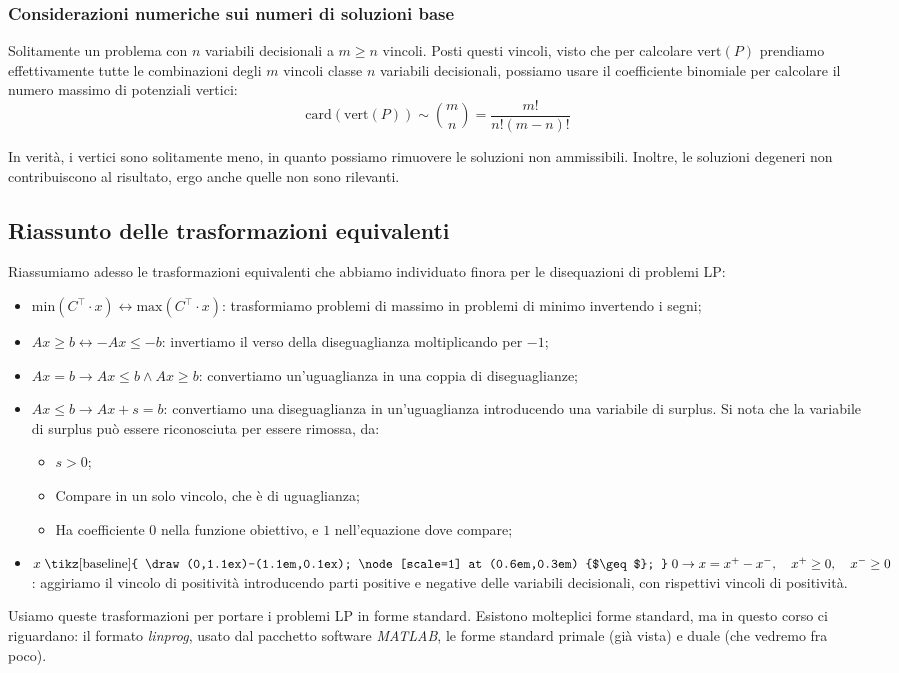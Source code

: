 \documentclass[a4paper,11pt]{article}
\begin{document}
\subsubsection{Considerazioni numeriche sui numeri di soluzioni base}
Solitamente un problema con $n$ variabili decisionali a $m \geq n$ vincoli.
Posti questi vincoli, visto che per calcolare $\mathrm{vert}(P)$ prendiamo effettivamente tutte le combinazioni degli $m$ vincoli classe $n$ variabili decisionali, possiamo usare il coefficiente binomiale per calcolare il numero massimo di potenziali vertici: 
$$ \mathrm{card}(\mathrm{vert}(P)) \sim \binom{m}{n} = \frac{m!}{n!(m-n)!} $$

In verità, i vertici sono solitamente meno, in quanto possiamo rimuovere le soluzioni non ammissibili.
Inoltre, le soluzioni degeneri non contribuiscono al risultato, ergo anche quelle non sono rilevanti.

\subsection{Riassunto delle trasformazioni equivalenti}
Riassumiamo adesso le trasformazioni equivalenti che abbiamo individuato finora per le disequazioni di problemi LP:
\begin{itemize}
	\item $\mathrm{min}(C^\intercal \cdot x) \leftrightarrow \mathrm{max}(C^\intercal \cdot x)$: trasformiamo problemi di massimo in problemi di minimo invertendo i segni;
	\item $Ax \geq b \leftrightarrow -Ax \leq -b$: invertiamo il verso della diseguaglianza moltiplicando per $-1$;
	\item $Ax = b \rightarrow Ax \leq b \wedge Ax \geq b$: convertiamo un'uguaglianza in una coppia di diseguaglianze;
	\item $Ax \leq b \rightarrow Ax + s = b$: convertiamo una diseguaglianza in un'uguaglianza introducendo una variabile di surplus. Si nota che la variabile di surplus può essere riconosciuta per essere rimossa, da:
		\begin{itemize}
			\item $s > 0$;
			\item Compare in un solo vincolo, che è di uguaglianza;
			\item Ha coefficiente $0$ nella funzione obiettivo, e $1$ nell'equazione dove compare;
		\end{itemize}
	\item $ x \mathrel{\text{\tikz[baseline]{
    \draw (0,1.1ex)--(1.1em,0.1ex);
    \node[scale=1] at (0.6em,0.3em) {$\geq$};
  }}} 0 \rightarrow x = x^+ - x^-, \quad x^+ \geq 0, \quad x^- \geq 0$: aggiriamo il vincolo di positività introducendo parti positive e negative delle variabili decisionali, con rispettivi vincoli di positività.
\end{itemize}

Usiamo queste trasformazioni per portare i problemi LP in forme standard.
Esistono molteplici forme standard, ma in questo corso ci riguardano: il formato \textit{linprog}, usato dal pacchetto software \textit{MATLAB}, le forme standard primale (già vista) e duale (che vedremo fra poco). 
\end{document}
